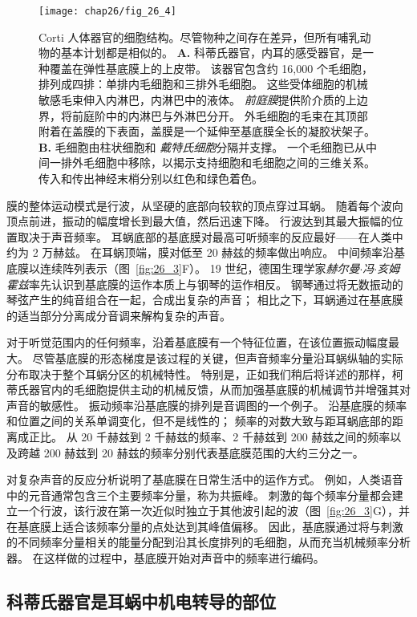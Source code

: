 \begin{figure}[htbp]
	\centering
	\texttt{[image: chap26/fig\_26\_4]}
	\caption{Corti 人体器官的细胞结构。尽管物种之间存在差异，但所有哺乳动物的基本计划都是相似的。
		\textbf{A.} 科蒂氏器官，内耳的感受器官，是一种覆盖在弹性基底膜上的上皮带。
		该器官包含约 16,000 个毛细胞，排列成四排：单排内毛细胞和三排外毛细胞。
		这些受体细胞的机械敏感毛束伸入内淋巴，内淋巴中的液体。
		\textit{前庭膜}提供阶介质的上边界，将前庭阶中的内淋巴与外淋巴分开。
		外毛细胞的毛束在其顶部附着在盖膜的下表面，盖膜是一个延伸至基底膜全长的凝胶状架子。
		\textbf{B.} 毛细胞由柱状细胞和 \textit{戴特氏细胞}分隔并支撑。
		一个毛细胞已从中间一排外毛细胞中移除，以揭示支持细胞和毛细胞之间的三维关系。
		传入和传出神经末梢分别以红色和绿色着色。}
	\label{fig:26_4}
\end{figure}


膜的整体运动模式是行波，从坚硬的底部向较软的顶点穿过耳蜗。
随着每个波向顶点前进，振动的幅度增长到最大值，然后迅速下降。
行波达到其最大振幅的位置取决于声音频率。
耳蜗底部的基底膜对最高可听频率的反应最好——在人类中约为 2 万赫兹。
在耳蜗顶端，膜对低至 20 赫兹的频率做出响应。
中间频率沿基底膜以连续阵列表示（图~\ref{fig:26_3}F）。
19 世纪，德国生理学家\textit{赫尔曼$\cdot$冯$\cdot$亥姆霍兹}率先认识到基底膜的运作本质上与钢琴的运作相反。
钢琴通过将无数振动的琴弦产生的纯音组合在一起，合成出复杂的声音；
相比之下，耳蜗通过在基底膜的适当部分分离成分音调来解构复杂的声音。


对于听觉范围内的任何频率，沿着基底膜有一个特征位置，在该位置振动幅度最大。
尽管基底膜的形态梯度是该过程的关键，但声音频率分量沿耳蜗纵轴的实际分布取决于整个耳蜗分区的机械特性。
特别是，正如我们稍后将详述的那样，柯蒂氏器官内的毛细胞提供主动的机械反馈，从而加强基底膜的机械调节并增强其对声音的敏感性。
振动频率沿基底膜的排列是音调图的一个例子。
沿基底膜的频率和位置之间的关系单调变化，但不是线性的； 频率的对数大致与距耳蜗底部的距离成正比。
从 20 千赫兹到 2 千赫兹的频率、2 千赫兹到 200 赫兹之间的频率以及跨越 200 赫兹到 20 赫兹的频率分别代表基底膜范围的大约三分之一。


对复杂声音的反应分析说明了基底膜在日常生活中的运作方式。
例如，人类语音中的元音通常包含三个主要频率分量，称为共振峰。
刺激的每个频率分量都会建立一个行波，该行波在第一次近似时独立于其他波引起的波（图~\ref{fig:26_3}G），并在基底膜上适合该频率分量的点处达到其峰值偏移。
因此，基底膜通过将与刺激的不同频率分量相关的能量分配到沿其长度排列的毛细胞，从而充当机械频率分析器。
在这样做的过程中，基底膜开始对声音中的频率进行编码。



\subsection{科蒂氏器官是耳蜗中机电转导的部位}

